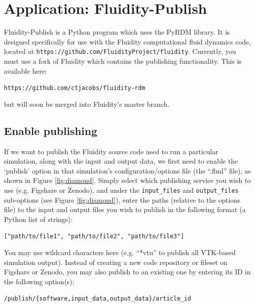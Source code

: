 \documentclass[a4paper,11pt]{report}
\begin{document}
\chapter{Application: Fluidity-Publish}
Fluidity-Publish is a Python program which uses the PyRDM library. It is designed specifically for use with the Fluidity computational fluid dynamics code, located at \texttt{https://github.com/FluidityProject/fluidity}. Currently, you must use a fork of Fluidity which contains the publishing functionality. This is available here:

\texttt{https://github.com/ctjacobs/fluidity-rdm}

but will soon be merged into Fluidity's master branch.

\section{Enable publishing}
If we want to publish the Fluidity source code used to run a particular simulation, along with the input and output data, we first need to enable the `publish' option in that simulation's configuration/options file (the ``.flml'' file), as shown in Figure \ref{fig:diamond}. Simply select which publishing service you wish to use (e.g. Figshare or Zenodo), and under the \texttt{input\_files} and \texttt{output\_files} sub-options (see Figure \ref{fig:diamond}), enter the paths (relative to the options file) to the input and output files you wish to publish in the following format (a Python list of strings): 

\texttt{["path/to/file1", "path/to/file2", "path/to/file3"]}

You may use wildcard characters here (e.g. ``*vtu'' to publish all VTK-based simulation output). Instead of creating a new code repository or fileset on Figshare or Zenodo, you may also publish to an existing one by entering its ID in the following option(s):

\texttt{/publish/\{software,input\_data,output\_data\}/article\_id}
\end{document}
